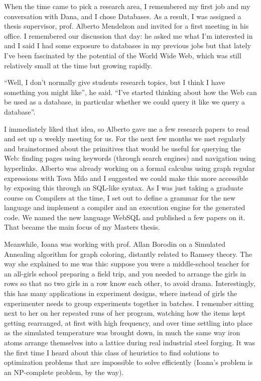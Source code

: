 \documentclass[12pt]{book}
\begin{document}
When the time came to pick a research area, I remembered my first job
and my conversation with Dana, and I chose Databases. As a result, I was
assigned a thesis supervisor, prof. Alberto Mendelzon and invited for a
first meeting in his office. I remembered our discussion that day: he
asked me what I'm interested in and I said I had some exposure to
databases in my previous jobs but that lately I've been fascinated by
the potential of the World Wide Web, which was still relatively small at
the time but growing rapidly.

``Well, I don't normally give students research topics, but I think I
have something you might like'', he said. ``I've started thinking about
how the Web can be used as a database, in particular whether we could
query it like we query a database''.

I immediately liked that idea, so Alberto gave me a few research papers
to read and set up a weekly meeting for us. For the next few months we
met regularly and brainstormed about the primitives that would be useful
for querying the Web: finding pages using keywords (through search
engines) and navigation using hyperlinks. Alberto was already working on
a formal calculus using graph regular expressions with Tova Milo and I
suggested we could make this more accessible by exposing this through an
SQL-like syntax. As I was just taking a graduate course on Compilers at
the time, I set out to define a grammar for the new language and
implement a compiler and an execution engine for the generated code. We
named the new language WebSQL and published a few papers on it. That
became the main focus of my Masters thesis.

Meanwhile, Ioana was working with prof. Allan Borodin on a Simulated
Annealing algorithm for graph coloring, distantly related to Ramsey
theory. The way she explained to me was this: suppose you were a
middle-school teacher for an all-girls school preparing a field trip,
and you needed to arrange the girls in rows so that no two girls in a
row know each other, to avoid drama. Interestingly, this has many
applications in experiment designs, where instead of girls the
experimenter needs to group experiments together in batches. I remember
sitting next to her on her repeated runs of her program, watching how
the items kept getting rearranged, at first with high frequency, and
over time settling into place as the simulated temperature was brought
down, in much the same way iron atoms arrange themselves into a lattice
during real industrial steel forging. It was the first time I heard
about this class of heuristics to find solutions to optimization
problems that are impossible to solve efficiently (Ioana's problem is an
NP-complete problem, by the way).
\end{document}
